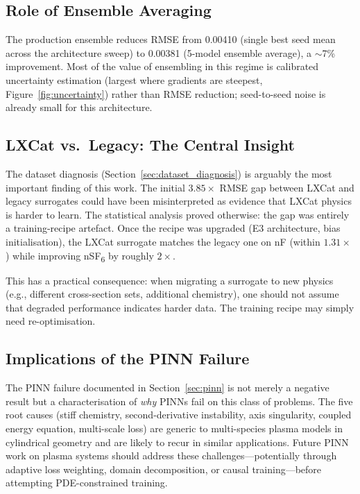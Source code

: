 \documentclass[12pt,a4paper]{article}
\begin{document}
\subsection{Role of Ensemble Averaging}

The production ensemble reduces RMSE from 0.00410 (single best seed
mean across the architecture sweep) to 0.00381 (5-model ensemble
average), a $\sim$7\% improvement.  Most of the value of ensembling
in this regime is calibrated uncertainty estimation (largest where
gradients are steepest, Figure~\ref{fig:uncertainty}) rather than
RMSE reduction; seed-to-seed noise is already small for this
architecture.

\subsection{LXCat vs.\ Legacy: The Central Insight}

The dataset diagnosis (Section~\ref{sec:dataset_diagnosis}) is
arguably the most important finding of this work.  The initial
$3.85\times$ RMSE gap between LXCat and legacy surrogates could have
been misinterpreted as evidence that LXCat physics is harder to
learn.  The statistical analysis proved otherwise: the gap was
entirely a training-recipe artefact.  Once the recipe was upgraded
(E3 architecture, bias initialisation), the LXCat surrogate matches
the legacy one on nF (within $1.31\times$) while improving
nSF\textsubscript{6} by roughly $2\times$.

This has a practical consequence: when migrating a surrogate to new
physics (e.g., different cross-section sets, additional chemistry),
one should not assume that degraded performance indicates harder data.
The training recipe may simply need re-optimisation.

\subsection{Implications of the PINN Failure}

The PINN failure documented in Section~\ref{sec:pinn} is not merely a
negative result but a characterisation of \emph{why} PINNs fail on
this class of problems.  The five root causes (stiff chemistry,
second-derivative instability, axis singularity, coupled energy
equation, multi-scale loss) are generic to multi-species plasma
models in cylindrical geometry and are likely to recur in similar
applications.  Future PINN work on plasma systems should address these
challenges---potentially through adaptive loss weighting, domain
decomposition, or causal training---before attempting
PDE-constrained training.
\end{document}
